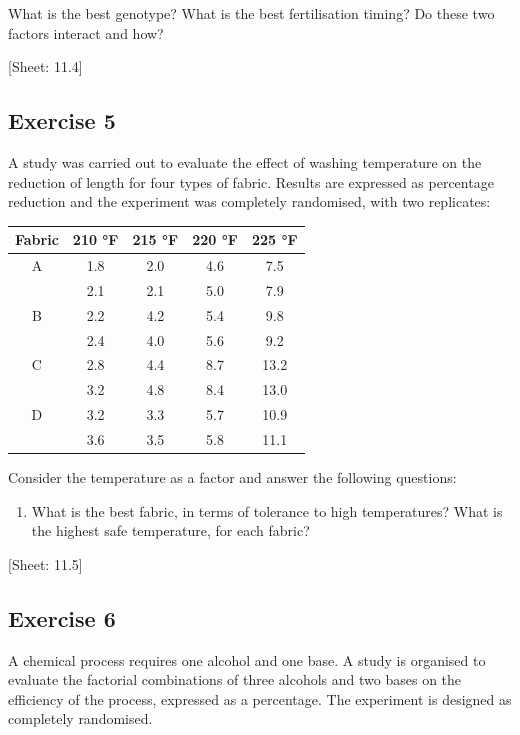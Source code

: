\documentclass[a4paper,12pt,oneside]{book}
\providecommand{\tightlist}{%
  \setlength{\itemsep}{0pt}\setlength{\parskip}{0pt}}
\begin{document}
What is the best genotype? What is the best fertilisation timing? Do these two factors interact and how?

{[}Sheet: 11.4{]}

\hypertarget{exercise-5-2}{%
\subsection{Exercise 5}\label{exercise-5-2}}

A study was carried out to evaluate the effect of washing temperature on the reduction of length for four types of fabric. Results are expressed as percentage reduction and the experiment was completely randomised, with two replicates:

\begin{longtable}[]{@{}ccccc@{}}
\toprule\noalign{}
Fabric & 210 °F & 215 °F & 220 °F & 225 °F \\
\midrule\noalign{}
\endhead
\bottomrule\noalign{}
\endlastfoot
A & 1.8 & 2.0 & 4.6 & 7.5 \\
& 2.1 & 2.1 & 5.0 & 7.9 \\
B & 2.2 & 4.2 & 5.4 & 9.8 \\
& 2.4 & 4.0 & 5.6 & 9.2 \\
C & 2.8 & 4.4 & 8.7 & 13.2 \\
& 3.2 & 4.8 & 8.4 & 13.0 \\
D & 3.2 & 3.3 & 5.7 & 10.9 \\
& 3.6 & 3.5 & 5.8 & 11.1 \\
\end{longtable}

Consider the temperature as a factor and answer the following questions:

\begin{enumerate}
\def\labelenumi{\arabic{enumi}.}
\tightlist
\item
  What is the best fabric, in terms of tolerance to high temperatures? What is the highest safe temperature, for each fabric?
\end{enumerate}

{[}Sheet: 11.5{]}

\hypertarget{exercise-6-2}{%
\subsection{Exercise 6}\label{exercise-6-2}}

A chemical process requires one alcohol and one base. A study is organised to evaluate the factorial combinations of three alcohols and two bases on the efficiency of the process, expressed as a percentage. The experiment is designed as completely randomised.
\end{document}
